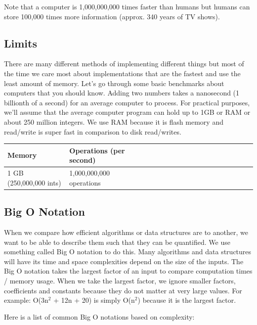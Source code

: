 \documentclass[11pt,oneside]{book}
\begin{document}
Note that a computer is 1,000,000,000 times faster than humans but humans can store 100,000 times more information (approx. 340 years of TV shows).

\subsection{Limits}

There are many different methods of implementing different things but most of the time we care most about implementations that are the fastest and use the least amount of memory. Let's go through some basic benchmarks about computers that you should know. Adding two numbers takes a nanosecond (1 billionth of a second) for an average computer to process. For practical purposes, we'll assume that the average computer program can hold up to 1GB or RAM or about 250 million integers. We use RAM because it is flash memory and read/write is super fast in comparison to disk read/writes.

\vspace{10px}\begin{tabulary}{0.4\linewidth}{|l|l|l|l|l|l|l|l|l|l|l|l|l|l|l|l|l|l|l}\hline


  Memory &
  Operations (per second)\\
\hline


  1 GB (250,000,000 ints) &
  1,000,000,000 operations\\

\hline\end{tabulary}

\subsection{Big O Notation}

When we compare how efficient algorithms or data structures are to another, we want to be able to describe them such that they can be quantified. We use something called Big O notation to do this. Many algorithms and data structures will have its time and space complexities depend on the size of the inputs. The Big O notation takes the largest factor of an input to compare computation times / memory usage. When we take the largest factor, we ignore smaller factors, coefficients and constants because they do not matter at very large values. For example: O(3n$^{2}$ + 12n + 20) is simply O(n$^{2}$) because it is the largest factor.

Here is a list of common Big O notations based on complexity:
\end{document}
